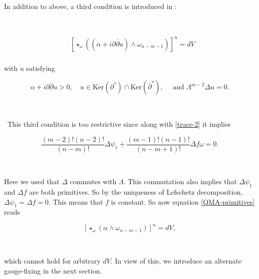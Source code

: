 \documentclass[10pt,a4paper]{amsart}
\newcommand{\spartial}{\partial^*}
\newcommand{\pbp}{\partial \bar{\partial}}
\newcommand{\Ker}{\mbox{Ker}}
\numberwithin{equation}{section}
\begin{document}



{ }

\bigskip

In addition to above, a third condition is introduced in \cite{DP25}:

\

\begin{equation}\label{MA-eqn2}
\begin{aligned}
    &\left[\star_{\omega}\left((\alpha + i \pbp u)\wedge \omega_{n-m-1}\right)\right]^n = dV\\
\end{aligned}
\end{equation}


\noindent with $u$ satisfying 

\begin{equation}\label{generalIC}
    \alpha + i \pbp u >0, \quad u \in \Ker (\spartial) \cap \Ker( \bar{\partial}^*), \quad \text{ and }\Lambda^{m-2} \Delta u =0.
\end{equation}

\

\ This third condition is too restrictive since along with \eqref{trace-2} it implies


\begin{equation}
    \frac{(m-2)!(n-2)!}{(n-m)!} \Delta \psi_1 + \frac{(m-1)!(n-1)!}{(n-m+1)!} \Delta f \omega = 0.
\end{equation}

\


Here we used that $\Delta$ commutes with $\Lambda$. This commutation also implies that $\Delta \psi_1$ and $\Delta f$ are both primitives. So by the uniqueness of Lefschetz decomposition, $\Delta \psi_1 = \Delta f =0$. This means that $f$ is constant. So now equation \eqref{QMA-primitives} reads

$$ [\star_{\omega}(\alpha\wedge \omega_{n-m-1})]^n = dV,$$


\

\noindent which cannot hold for arbitrary $dV$. In view of this, we introduce an alternate gauge-fixing in the next section.
\end{document}
